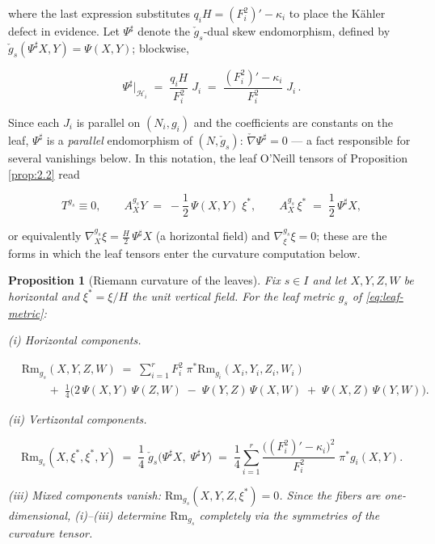 \documentclass[11pt]{amsart}
\theoremstyle{plain}
\numberwithin{equation}{section}
\newtheorem{proposition}[theorem]{Proposition}
\theoremstyle{definition}
\theoremstyle{remark}
\begin{document}
where the last expression substitutes $q_i H = (F_i^2)' - \kappa_i$ to place the Kähler defect in evidence. Let $\Psi^\sharp$ denote the $\check{g}_s$-dual skew endomorphism, defined by $\check{g}_s(\Psi^\sharp X, Y) = \Psi(X, Y)$; blockwise,

\[
\Psi^\sharp \Big|_{\mathcal{H}_i} \;=\; \frac{q_i H}{F_i^2}\; J_i \;=\; \frac{(F_i^2)' - \kappa_i}{F_i^2}\; J_i \, .
\]

Since each $J_i$ is parallel on $(N_i, g_i)$ and the coefficients are constants on the leaf, $\Psi^\sharp$ is a \emph{parallel} endomorphism of $(N, \check{g}_s)$: $\check{\nabla} \Psi^\sharp = 0$ --- a fact responsible for several vanishings below. In this notation, the leaf O'Neill tensors of Proposition \ref{prop:2.2} read

\begin{equation}\label{eq:leaf-connection}
	T^{g_s} \equiv 0, \qquad A^{g_s}_X Y \;=\; -\frac{1}{2}\, \Psi(X, Y)\; \xi^*, \qquad A^{g_s}_X\, \xi^* \;=\; \frac{1}{2}\, \Psi^\sharp X ,
\end{equation}

or equivalently $\nabla^{g_s}_X \xi = \tfrac{H}{2}\, \Psi^\sharp X$ (a horizontal field) and $\nabla^{g_s}_\xi \xi = 0$; these are the forms in which the leaf tensors enter the curvature computation below.

\begin{proposition}[Riemann curvature of the leaves]\label{prop:leaf-curvature}
	Fix $s \in I$ and let $X, Y, Z, W$ be horizontal and $\xi^* = \xi / H$ the unit vertical field. For the leaf metric $g_s$ of \eqref{eq:leaf-metric}:
	
	\emph{(i) Horizontal components.}
	
	\begin{equation}\label{eq:leaf-curvature}
		\begin{aligned}
			&\mathrm{Rm}_{g_s}(X, Y, Z, W) \;=\; \sum_{i=1}^r F_i^2\; \pi^*\mathrm{Rm}_{g_i}(X_i, Y_i, Z_i, W_i) \\
			&\qquad \;+\; \frac{1}{4}\Big( 2\, \Psi(X,Y)\, \Psi(Z,W) \;-\; \Psi(Y,Z)\, \Psi(X,W) \;+\; \Psi(X,Z)\, \Psi(Y,W) \Big).
		\end{aligned}
	\end{equation}
	
	\emph{(ii) Vertizontal components.}
	
	\begin{equation}\label{eq:leaf-ricci}
		\mathrm{Rm}_{g_s}(X, \xi^*, \xi^*, Y) \;=\; \frac{1}{4}\; \check{g}_s\big( \Psi^\sharp X, \; \Psi^\sharp Y \big) \;=\; \frac{1}{4} \sum_{i=1}^r \frac{\big( (F_i^2)' - \kappa_i \big)^2}{F_i^2}\; \pi^*g_i(X, Y) .
	\end{equation}
	
	\emph{(iii) Mixed components vanish:} $\mathrm{Rm}_{g_s}(X, Y, Z, \xi^*) = 0$. Since the fibers are one-dimensional, (i)--(iii) determine $\mathrm{Rm}_{g_s}$ completely via the symmetries of the curvature tensor.
	
\end{proposition}
\end{document}
